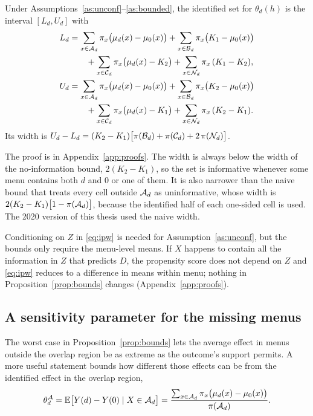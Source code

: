 \begin{proposition}\label{prop:bounds}
Under Assumptions~\ref{as:unconf}--\ref{as:bounded}, the identified set for $\theta_d(h)$ is the interval
$[L_d,U_d]$ with
\begin{align*}
L_d&=\sum_{x\in\mathcal{A}_d}\pi_x\bigl(\mu_d(x)-\mu_0(x)\bigr)+\sum_{x\in\mathcal{B}_d}\pi_x\bigl(K_1-\mu_0(x)\bigr)\\
&\qquad+\sum_{x\in\mathcal{C}_d}\pi_x\bigl(\mu_d(x)-K_2\bigr)+\sum_{x\in\mathcal{N}_d}\pi_x\,(K_1-K_2),\\
U_d&=\sum_{x\in\mathcal{A}_d}\pi_x\bigl(\mu_d(x)-\mu_0(x)\bigr)+\sum_{x\in\mathcal{B}_d}\pi_x\bigl(K_2-\mu_0(x)\bigr)\\
&\qquad+\sum_{x\in\mathcal{C}_d}\pi_x\bigl(\mu_d(x)-K_1\bigr)+\sum_{x\in\mathcal{N}_d}\pi_x\,(K_2-K_1).
\end{align*}
Its width is $U_d-L_d=(K_2-K_1)\bigl[\pi(\mathcal{B}_d)+\pi(\mathcal{C}_d)+2\,\pi(\mathcal{N}_d)\bigr]$.
\end{proposition}

The proof is in Appendix~\ref{app:proofs}. The width is always below the width of the no-information bound,
$2(K_2-K_1)$, so the set is informative whenever some menu contains both $d$ and $0$ or one of them. It is also
narrower than the naive bound that treats every cell outside $\mathcal{A}_d$ as uninformative, whose width is
$2(K_2-K_1)\bigl[1-\pi(\mathcal{A}_d)\bigr]$, because the identified half of each one-sided cell is used. The 2020
version of this thesis used the naive width.

\begin{remark}
Conditioning on $Z$ in \eqref{eq:ipw} is needed for Assumption~\ref{as:unconf}, but the bounds only require the
menu-level means. If $X$ happens to contain all the information in $Z$ that predicts $D$, the propensity score
does not depend on $Z$ and \eqref{eq:ipw} reduces to a difference in means within menu; nothing in
Proposition~\ref{prop:bounds} changes (Appendix~\ref{app:proofs}).
\end{remark}

\subsection{A sensitivity parameter for the missing menus}

The worst case in Proposition~\ref{prop:bounds} lets the average effect in menus outside the overlap region be as
extreme as the outcome's support permits. A more useful statement bounds how different those effects can be from
the identified effect in the overlap region,
\[
\theta_d^{\mathcal{A}}=\operatorname{\mathbb{E}}\bigl[Y(d)-Y(0)\mid X\in\mathcal{A}_d\bigr]=\frac{\sum_{x\in\mathcal{A}_d}\pi_x\bigl(\mu_d(x)-\mu_0(x)\bigr)}{\pi(\mathcal{A}_d)}.
\]


